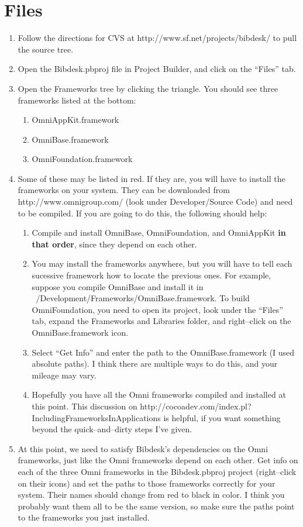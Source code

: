 \documentclass[11pt]{article}
\begin{document}
\section{Files}
\begin{enumerate}
\item Follow the directions for CVS at http://www.sf.net/projects/bibdesk/ to pull the source tree.
\item Open the Bibdesk.pbproj file in Project Builder, and click on the ``Files'' tab.
\item Open the Frameworks tree by clicking the triangle.  You should see three frameworks listed at the bottom:
  \begin{enumerate}
  \item OmniAppKit.framework
  \item OmniBase.framework
  \item OmniFoundation.framework
  \end{enumerate}
\item Some of these may be listed in red.  If they are, you will have to install the frameworks on your system.  They can be downloaded from http://www.omnigroup.com/ (look under Developer/Source Code) and need to be compiled.  If you are going to do this, the following should help:
  \begin{enumerate}
  \item Compile and install OmniBase, OmniFoundation, and OmniAppKit \textbf{in that order}, since they depend on each other.
  \item You may install the frameworks anywhere, but you will have to tell each sucessive framework how to locate the previous ones.  For example, suppose you compile OmniBase and install it in ~/Development/Frameworks/OmniBase.framework.  To build OmniFoundation, you need to open its project, look under the ``Files'' tab, expand the Frameworks and Libraries folder, and right--click on the OmniBase.framework icon.
  \item Select ``Get Info'' and enter the path to the OmniBase.framework (I used absolute paths).  I think there are multiple ways to do this, and your mileage may vary.
  \item Hopefully you have all the Omni frameworks compiled and installed at this point.  This discussion on http://cocoadev.com/index.pl?IncludingFrameworksInApplications is helpful, if you want something beyond the quick--and--dirty steps I've given.
  \end{enumerate}
\item At this point, we need to satisfy Bibdesk's dependencies on the Omni frameworks, just like the Omni frameworks depend on each other.  Get info on each of the three Omni frameworks in the Bibdesk.pbproj project (right--click on their icons) and set the paths to those frameworks correctly for your system.  Their names should change from red to black in color.  I think you probably want them all to be the same version, so make sure the paths point to the frameworks you just installed.
\end{enumerate}
\end{document}
